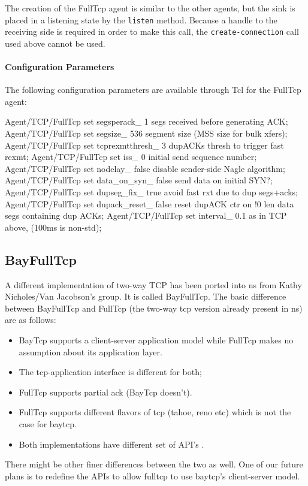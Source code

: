 The creation of the FullTcp agent is similar to the other agents,
but the sink is placed in a listening state by the {\tt listen} method.
Because a handle to the receiving side is required in order to make
this call, the {\tt create-connection} call used above cannot be used.

\paragraph{Configuration Parameters}
The following configuration parameters are available through Tcl
for the FullTcp agent:
\begin{program}
Agent/TCP/FullTcp set segsperack_ 1 \; segs received before generating ACK;
Agent/TCP/FullTcp set segsize_ 536  \; segment size (MSS size for bulk xfers);
Agent/TCP/FullTcp set tcprexmtthresh_ 3 \; dupACKs thresh to trigger fast rexmt;
Agent/TCP/FullTcp set iss_ 0 \; initial send sequence number;
Agent/TCP/FullTcp set nodelay_ false \; disable sender-side Nagle algorithm;
Agent/TCP/FullTcp set data_on_syn_ false \; send data on initial SYN?;
Agent/TCP/FullTcp set dupseg_fix_ true \; avoid fast rxt due to dup segs+acks;
Agent/TCP/FullTcp set dupack_reset_ false \; reset dupACK ctr on !0 len data segs containing dup ACKs;
Agent/TCP/FullTcp set interval_ 0.1 \; as in TCP above, (100ms is non-std);
\end{program}


\subsection{BayFullTcp}
\label{sec:bayfulltcp}

A different implementation of two-way TCP has been ported into ns from Kathy Nicholes/Van Jacobson's group. It is called BayFullTcp. The basic difference between BayFullTcp and FullTcp (the two-way tcp version already present in ns) are as follows:
\begin{itemize}
\item BayTcp supports a client-server application model while FullTcp makes no assumption about its application layer.
\item The tcp-application interface is different for both;
\item FullTcp supports partial ack (BayTcp doesn't).
\item FullTcp supports different flavors of tcp (tahoe, reno etc) which is not the case for baytcp.
\item Both implementations have different set of API's .
\end{itemize}
There might be other finer differences between the two as well.
One of our future plans is to redefine the APIs to allow fulltcp to use
baytcp's client-server model.



